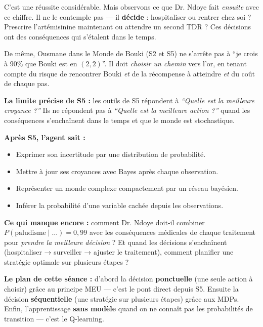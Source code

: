 \documentclass[11pt,a4paper]{article}
\begin{document}
C'est une réussite considérable. Mais observons ce que Dr. Ndoye fait \textit{ensuite} avec ce chiffre. Il ne le contemple pas --- il \textbf{décide} : hospitaliser ou rentrer chez soi ? Prescrire l'artémisinine maintenant ou attendre un second TDR ? Ces décisions ont des conséquences qui s'étalent dans le temps.

De même, Ousmane dans le Monde de Bouki (S2 et S5) ne s'arrête pas à ``je crois à 90\% que Bouki est en $(2,2)$''. Il doit \textit{choisir un chemin} vers l'or, en tenant compte du risque de rencontrer Bouki \textit{et} de la récompense à atteindre \textit{et} du coût de chaque pas.

\textbf{La limite précise de S5 :} les outils de S5 répondent à \textit{``Quelle est la meilleure croyance ?''} Ils ne répondent pas à \textit{``Quelle est la meilleure action ?''} quand les conséquences s'enchaînent dans le temps et que le monde est stochastique.

\begin{prereqbox}
\textbf{Après S5, l'agent sait :}
\begin{itemize}[nosep]
    \item Exprimer son incertitude par une distribution de probabilité.
    \item Mettre à jour ses croyances avec Bayes après chaque observation.
    \item Représenter un monde complexe compactement par un réseau bayésien.
    \item Inférer la probabilité d'une variable cachée depuis les observations.
\end{itemize}

\textbf{Ce qui manque encore :} comment Dr. Ndoye doit-il combiner $P(\text{paludisme} \mid \ldots)= 0{,}99$ avec les conséquences médicales de chaque traitement pour \textit{prendre la meilleure décision} ? Et quand les décisions s'enchaînent (hospitaliser → surveiller → ajuster le traitement), comment planifier une stratégie optimale sur plusieurs étapes ?

\medskip
\textbf{Le plan de cette séance :} d'abord la décision \textbf{ponctuelle} (une seule action à choisir) grâce au principe MEU --- c'est le pont direct depuis S5. Ensuite la décision \textbf{séquentielle} (une stratégie sur plusieurs étapes) grâce aux MDPs. Enfin, l'apprentissage \textbf{sans modèle} quand on ne connaît pas les probabilités de transition --- c'est le Q-learning.
\end{prereqbox}
\end{document}
